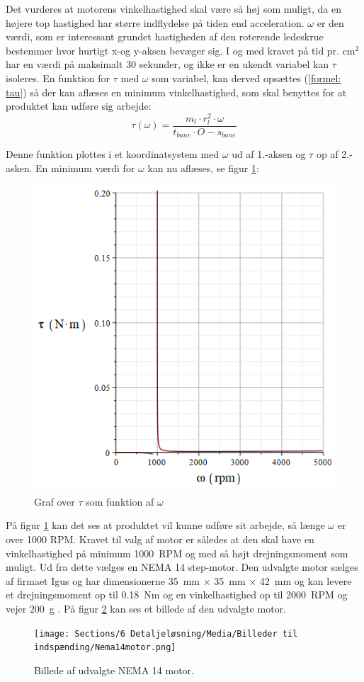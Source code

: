 Det vurderes at motorens vinkelhastighed skal være så høj som muligt, da en højere top hastighed har større indflydelse på tiden end acceleration. \(\omega\) er den værdi, som er interessant grundet hastigheden af den roterende ledeskrue bestemmer hvor hurtigt x-og y-aksen bevæger sig. I og med kravet på tid pr. cm\(^2\) har en værdi på maksimalt 30 sekunder, og ikke er en ukendt variabel kan \(\tau\) isoleres. 
En funktion for $\tau$ med \(\omega\) som variabel, kan derved opsættes (\ref{formel: tau}) så der kan aflæses en minimum vinkelhastighed, som skal benyttes for at produktet kan udføre sig arbejde:
\begin{equation}\label{formel: tau}
    \tau(\omega)=\dfrac{m_{l} \cdot r_{l}^2 \cdot \omega}{t_{bane} \cdot O - s_{bane}}
\end{equation}

Denne funktion plottes i et koordinatsystem med \(\omega\) ud af 1.-aksen og \(\tau\) op af 2.-asken. En minimum værdi for \(\omega\) kan nu aflæses, se figur \ref{fig: Tau-Omega plot}:
\begin{figure}[H]
    \centering
    \includegraphics[width=0.6\linewidth]{Sections/6 Detaljeløsning/Media/Billeder til indspænding/tau-omegaplot.png}
    \caption{Graf over \(\tau\) som funktion af \(\omega\)}
    \label{fig: Tau-Omega plot}
\end{figure}

På figur \ref{fig: Tau-Omega plot} kan det ses at produktet vil kunne udføre sit arbejde, så længe \(\omega\) er over 1000 RPM. Kravet til valg af motor er således at den skal have en vinkelhastighed på minimum \SI{1000}{RPM} og med så højt drejningsmoment som muligt. Ud fra dette vælges en NEMA 14 step-motor. Den udvalgte motor sælges af firmaet Igus og har dimensionerne \SI{35}{mm} \(\times\) \SI{35}{mm} \(\times\) \SI{42}{mm} og kan levere et drejningsmoment op til \SI{0.18}{Nm} og en vinkelhastighed op til \SI{2000}{RPM} og vejer \SI{200}{g} \parencite{Igus2025DrylinNEMA14}. På figur \ref{fig:Udvalgte motor} kan ses et billede af den udvalgte motor. 
\begin{figure}[H]
    \centering
    \texttt{[image: Sections/6 Detaljeløsning/Media/Billeder til indspænding/Nema14motor.png]}
        \caption{Billede af udvalgte NEMA 14 motor. \parencite{Igus2025DrylinNEMA14}}
        \label{fig:Udvalgte motor}
\end{figure}

